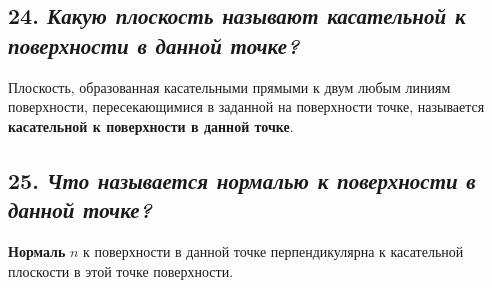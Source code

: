 \newpage
\subsection*{24. \textit{Какую плоскость называют касательной к поверхности в данной точке?}}

\begin{mainQuote}
    
\end{mainQuote}

Плоскость, образованная касательными прямыми к двум любым линиям поверхности, пересекающимися в заданной на поверхности точке, называется {\bf касательной к поверхности в данной точке}.



\newpage
\subsection*{25. \textit{Что называется нормалью к поверхности в данной точке?}}

\begin{mainQuote}
    
\end{mainQuote}

{\bf Нормаль} $n$ к поверхности в данной точке перпендикулярна к касательной плоскости в этой точке поверхности.


\newpage
\let\clearpage\relax
